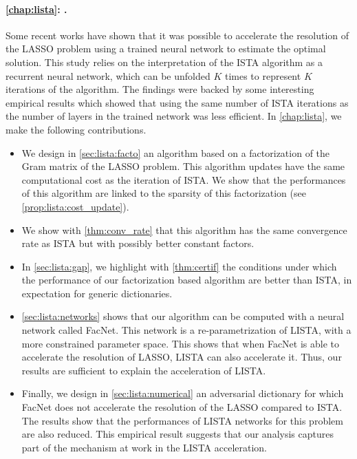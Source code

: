 \documentclass[../thesis.tex]{subfiles}
\begin{document}



\paragraph{\autoref{chap:lista}: .}
\label{par:contrib:lista}

Some recent works have shown that it was possible to accelerate the resolution of the LASSO problem using a trained neural network to estimate the optimal solution. This study relies on the interpretation of the ISTA algorithm as a recurrent neural network, which can be unfolded $K$ times to represent $K$ iterations of the algorithm. The findings were backed by some interesting empirical results which showed that using the same number of ISTA iterations as the number of layers in the trained network was less efficient. In \autoref{chap:lista}, we make the following contributions.

\begin{itemize}\itemsep.3em
	\renewcommand{\labelitemi}{\raisebox{-.1em}{\color{linkcolor!50}$\blacktriangleright$}}

	\item We design in \autoref{sec:lista:facto} an algorithm based on a factorization of
	the Gram matrix of the LASSO problem. This algorithm updates have the same computational
	cost as the iteration of ISTA. We show that the performances of this algorithm are
	linked to the sparsity of this factorization (see \autoref{prop:lista:cost_update}).

	\item We show with \autoref{thm:conv_rate} that this algorithm has the same convergence
	rate as ISTA but with possibly better constant factors.

	\item In \autoref{sec:lista:gap}, we highlight with \autoref{thm:certif} the conditions
	under which the performance of our factorization based algorithm are better than ISTA,
	in expectation for generic dictionaries.

	\item \autoref{sec:lista:networks} shows that our algorithm can be computed with a
	neural network called FacNet. This network is a re-parametrization of LISTA, with a
	more constrained parameter space. This shows that when FacNet is able to accelerate
	the resolution of LASSO, LISTA can also accelerate it. Thus, our results are sufficient
	to explain the acceleration of LISTA.

	\item Finally, we design in \autoref{sec:lista:numerical} an adversarial dictionary
	for which FacNet does not accelerate the resolution of the LASSO compared to ISTA.
	The results show that the performances
	of LISTA networks for this problem are also reduced. This empirical result suggests that
	our analysis captures part of the mechanism at work in the LISTA acceleration.

\end{itemize}
\end{document}
